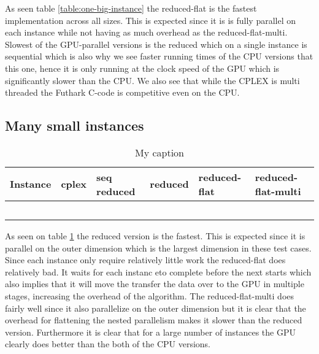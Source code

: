 As seen table \ref{table:one-big-instance} the reduced-flat is the fastest implementation across all sizes. This is expected since it is is fully parallel on each instance while not having as much overhead as the reduced-flat-multi. Slowest of the GPU-parallel versions is the reduced which on a single instance is sequential which is also why we see faster running times of the CPU versions that this one, hence it is only running at the clock speed of the GPU which is significantly slower than the CPU. We also see that while the CPLEX is multi threaded the Futhark C-code is competitive even on the CPU. 

\subsection{Many small instances}
\begin{table}[H]
	\centering
	\label{table:many_small_instances}
	\begin{tabular}{|l|l|l|l|l|l|}\hline
		Instance & cplex & seq reduced & reduced & reduced-flat & reduced-flat-multi \\\hline
		&       &             &         &              &                    \\\hline
		&       &             &         &              &                    \\\hline
		&       &             &         &              &                   \\\hline
		&       &             &         &              &                   \\\hline
		&       &             &         &              &                   \\\hline
	\end{tabular}
	\caption{My caption}
\end{table}


As seen on table \ref{table:many_small_instances} the reduced version is the fastest. This is expected since it is parallel on the outer dimension which is the largest dimension in these test cases. Since each instance only require relatively little work the reduced-flat does relatively bad. It waits for each instanc eto complete before the next starts which also implies that it will move the transfer the data over to the GPU in multiple stages, increasing the overhead of the algorithm. The reduced-flat-multi does fairly well since it also parallelize on the outer dimension but it is clear that the overhead for flattening the nested parallelism makes it slower than the reduced version. Furthermore it is clear that for a large number of instances the GPU clearly does better than the both of the CPU versions.


